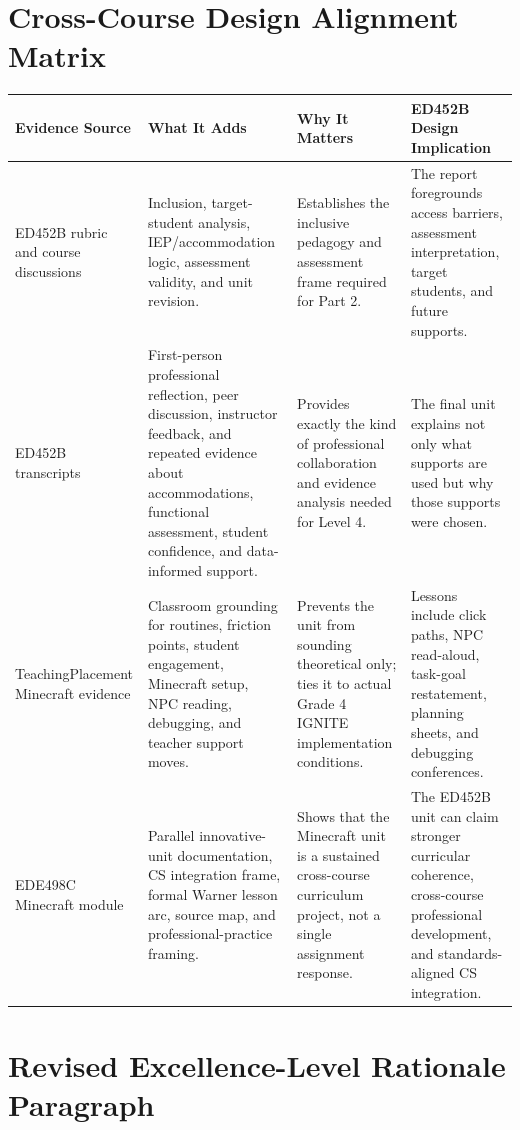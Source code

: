 \documentclass[12pt]{article}
\begin{document}
\section{Cross-Course Design Alignment Matrix}

\begin{xltabular}{\textwidth}{|P{1.45in}|P{2.0in}|P{2.0in}|L|}
\hline
{}\color{white}\bfseries Evidence Source & \color{white}\bfseries What It Adds & \color{white}\bfseries Why It Matters & \color{white}\bfseries ED452B Design Implication \\
\hline
ED452B rubric and course discussions & Inclusion, target-student analysis, IEP/accommodation logic, assessment validity, and unit revision. & Establishes the inclusive pedagogy and assessment frame required for Part 2. & The report foregrounds access barriers, assessment interpretation, target students, and future supports. \\
\hline
{} ED452B transcripts & First-person professional reflection, peer discussion, instructor feedback, and repeated evidence about accommodations, functional assessment, student confidence, and data-informed support. & Provides exactly the kind of professional collaboration and evidence analysis needed for Level 4. & The final unit explains not only what supports are used but why those supports were chosen. \\
\hline
TeachingPlacement Minecraft evidence & Classroom grounding for routines, friction points, student engagement, Minecraft setup, NPC reading, debugging, and teacher support moves. & Prevents the unit from sounding theoretical only; ties it to actual Grade 4 IGNITE implementation conditions. & Lessons include click paths, NPC read-aloud, task-goal restatement, planning sheets, and debugging conferences. \\
\hline
{} EDE498C Minecraft module & Parallel innovative-unit documentation, CS integration frame, formal Warner lesson arc, source map, and professional-practice framing. & Shows that the Minecraft unit is a sustained cross-course curriculum project, not a single assignment response. & The ED452B unit can claim stronger curricular coherence, cross-course professional development, and standards-aligned CS integration. \\
\hline
\end{xltabular}

\section{Revised Excellence-Level Rationale Paragraph}
\end{document}
